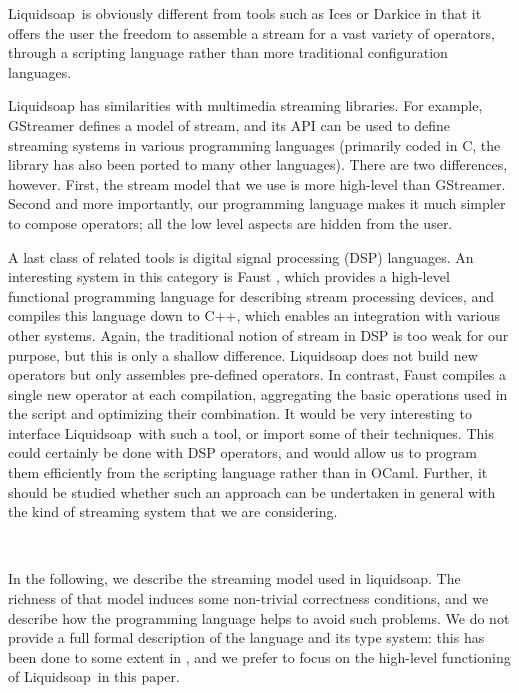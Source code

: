 \documentclass{llncs}
\newcommand{\liquidsoap}{Liquidsoap}
\begin{document}
\liquidsoap\ is obviously different from tools such as Ices or Darkice in
that it offers the user the freedom to assemble a stream
for a vast variety of operators, through a scripting
language rather than more traditional configuration languages.

Liquidsoap has similarities with multimedia streaming libraries.
For example, GStreamer defines a model of stream, and its API
can be used to define streaming systems in various programming
languages (primarily coded in C, the library has also been
ported to many other languages).
There are two differences, however.
First, the stream model that we use is more high-level than
GStreamer. %
Second and more importantly,
our programming language makes it much simpler
to compose operators; all the low level aspects are hidden
from the user.

A last class of related tools is digital signal processing (DSP) languages.
An interesting system in this category is Faust \cite{faust},
which provides a high-level functional programming language for
describing stream processing devices,
and compiles this language down to C++, which enables an integration
with various other systems.
Again, the traditional notion of stream in DSP is too weak for our
purpose, but this is only a shallow difference.
Liquidsoap does not build new operators but only assembles pre-defined
operators. In contrast, Faust compiles a single new operator at each
compilation, aggregating the basic operations used in the script
and optimizing their combination.
It would be very interesting to interface \liquidsoap\ with such a tool,
or import some of their techniques. This could certainly be done with
DSP operators, and would allow us to program them efficiently from
the scripting language rather than in OCaml. Further, it should
be studied whether such an approach can be undertaken in general with
the kind of streaming system that we are considering.

~


In the following, we describe the streaming model used in liquidsoap.
The richness of that model induces some non-trivial correctness conditions,
and we describe how the programming language helps to avoid such
problems.
We do not provide a full formal description of the language and its
type system: this has been done to some extent in 
\cite{baelde-mimram:webradio-lambda}, and we prefer to focus on the
high-level functioning of \liquidsoap\ in this paper.
\end{document}
